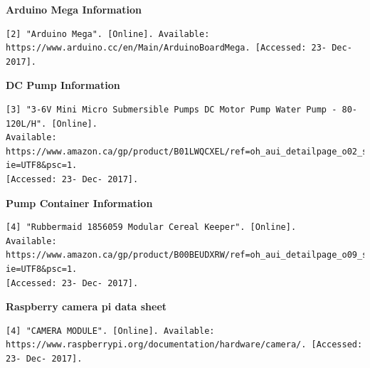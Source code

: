 \documentclass [10pt]{article}
\begin{document}
\textbf{Arduino Mega Information}
\begin{verbatim}
[2] "Arduino Mega". [Online]. Available:
https://www.arduino.cc/en/Main/ArduinoBoardMega. [Accessed: 23- Dec- 2017].
\end{verbatim}

\textbf{DC Pump Information}
\begin{verbatim}
[3] "3-6V Mini Micro Submersible Pumps DC Motor Pump Water Pump - 80-120L/H". [Online]. 
Available: 
https://www.amazon.ca/gp/product/B01LWQCXEL/ref=oh_aui_detailpage_o02_s00?ie=UTF8&psc=1.
[Accessed: 23- Dec- 2017].
\end{verbatim}
\textbf{Pump Container Information}
\begin{verbatim}
[4] "Rubbermaid 1856059 Modular Cereal Keeper". [Online]. 
Available: 
https://www.amazon.ca/gp/product/B00BEUDXRW/ref=oh_aui_detailpage_o09_s00?ie=UTF8&psc=1. 
[Accessed: 23- Dec- 2017].
\end{verbatim}

\textbf{Raspberry camera pi data sheet}
\begin{verbatim}
[4] "CAMERA MODULE". [Online]. Available:
https://www.raspberrypi.org/documentation/hardware/camera/. [Accessed: 23- Dec- 2017].
\end{verbatim}
\end{document}
